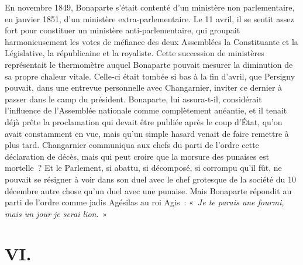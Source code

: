 \documentclass[french,twoside]{book} %
\newcommand\chapteropen{} %
\newcommand\chapterclose{} %
\begin{document}
En novembre 1849, Bonaparte s’était contenté d’un ministère non parlementaire, en janvier 1851, d’un ministère extra-parlementaire. Le 11 avril, il se sentit assez fort pour constituer un ministère anti-parlementaire, qui groupait harmonieusement les votes de méfiance des deux Assemblées la Constituante et la Législative, la républicaine et la royaliste. Cette succession de ministères représentait le thermomètre auquel Bonaparte pouvait mesurer la diminution de sa propre chaleur vitale. Celle-ci était tombée si bas à la fin d’avril, que Persigny pouvait, dans une entrevue personnelle avec Changarnier, inviter ce dernier à passer dans le camp du président. Bonaparte, lui assura-t-il, considérait l’influence de l’Assemblée nationale comme complètement anéantie, et il tenait déjà prête la proclamation qui devait être publiée après le coup d’État, qu’on avait constamment en vue, mais qu’un simple hasard venait de faire remettre à plus tard. Changarnier communiqua aux chefs du parti de l’ordre cette déclaration de décès, mais qui peut croire que la morsure des punaises est mortelle ? Et le Parlement, si abattu, si décomposé, si corrompu qu’il fût, ne pouvait se résigner à voir dans son duel avec le chef grotesque de la société du 10 décembre autre chose qu’un duel avec une punaise. Mais Bonaparte répondit au parti de l’ordre comme jadis Agésilas au roi Agis : « \emph{Je te parais une fourmi, mais un jour je serai lion}. »
\chapterclose


\chapteropen
\chapter[VI.]{VI.}\renewcommand{\leftmark}{VI.}
\end{document}
